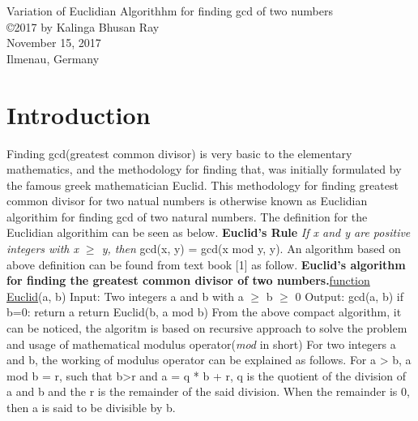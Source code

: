 \documentclass[12pt]{article}
\begin{document}
\begin{center}
{\large Variation of Euclidian Algorithhm for finding gcd of two numbers} \\
\copyright 2017 by Kalinga Bhusan Ray \\
November 15, 2017 \\
Ilmenau, Germany \\
\author{Kalinga Bhusan Ray}
\end{center}

\section{Introduction}
Finding gcd(greatest common divisor) is very basic to the elementary mathematics, 
and the methodology for finding that, was initially formulated by the famous greek mathematician Euclid. This methodology for finding greatest common divisor for two natual numbers is otherwise known as Euclidian algorithim for finding gcd of two 
natural numbers. The definition for the Euclidian algorithim can be seen as below.
\newline \newline \textbf {Euclid's Rule} \textit {If x and y are positive integers with x $\geq$ y,
 then} \break \vspace{0mm} \hspace{4cm} gcd(x, y) = gcd(x mod y, y).
\newline 
\newline An algorithm based on above definition can be found from text book [1] as follow.
\newline \textbf {Euclid's algorithm for finding the greatest common divisor of two numbers.}\newline \underline {function Euclid}(a, b)
\newline Input: Two integers a and b with a $\geq$ b $\geq$ 0 
\newline Output: gcd(a, b)
\newline
\newline if b=0: return a
\newline return Euclid(b, a mod b)
\newline 
\newline From the above compact algorithm, it can be noticed, the algoritm is based on recursive approach to solve the problem and usage of mathematical modulus operator(\textit {mod} in short)
For two integers a and b, the working of modulus operator can be explained as follows.
For a > b, a mod b = r,  such that b>r and  a = q * b + r, q is the quotient of the division of a and b and the r is the remainder of the said division. When the remainder is 0, then a is said to be divisible by b.
\end{document}
